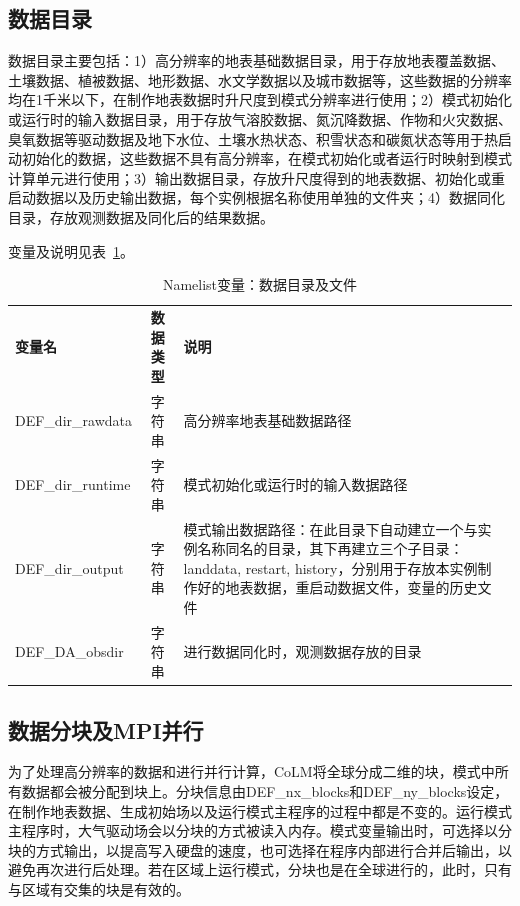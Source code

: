 \documentclass[a4paper,12pt,twoside]{article}
\begin{document}
\subsection{数据目录}

数据目录主要包括：1）高分辨率的地表基础数据目录，用于存放地表覆盖数据、土壤数据、植被数据、地形数据、水文学数据以及城市数据等，这些数据的分辨率均在1千米以下，在制作地表数据时升尺度到模式分辨率进行使用；2）模式初始化或运行时的输入数据目录，用于存放气溶胶数据、氮沉降数据、作物和火灾数据、臭氧数据等驱动数据及地下水位、土壤水热状态、积雪状态和碳氮状态等用于热启动初始化的数据，这些数据不具有高分辨率，在模式初始化或者运行时映射到模式计算单元进行使用；3）输出数据目录，存放升尺度得到的地表数据、初始化或重启动数据以及历史输出数据，每个实例根据名称使用单独的文件夹；4）数据同化目录，存放观测数据及同化后的结果数据。

变量及说明见表~\ref{table_nl_dir_file}。

\begin{table}[!htbp] \small
\caption{Namelist变量：数据目录及文件} \label{table_nl_dir_file}
\centering \renewcommand{\arraystretch}{1.2}
\begin{tabular}{lcp{}}
\toprule
\textbf{变量名} & \textbf{数据类型} & \textbf{说明} \\
DEF\_dir\_rawdata & 字符串 & 高分辨率地表基础数据路径 \\
DEF\_dir\_runtime & 字符串 & 模式初始化或运行时的输入数据路径 \\
DEF\_dir\_output & 字符串 & 模式输出数据路径：在此目录下自动建立一个与实例名称同名的目录，其下再建立三个子目录：landdata, restart, history，分别用于存放本实例制作好的地表数据，重启动数据文件，变量的历史文件 \\
DEF\_DA\_obsdir & 字符串 & 进行数据同化时，观测数据存放的目录 \\
\bottomrule
\end{tabular} 
\end{table}

\subsection{数据分块及MPI并行}

为了处理高分辨率的数据和进行并行计算，CoLM将全球分成二维的块，模式中所有数据都会被分配到块上。分块信息由DEF\_nx\_blocks和DEF\_ny\_blocks设定，在制作地表数据、生成初始场以及运行模式主程序的过程中都是不变的。运行模式主程序时，大气驱动场会以分块的方式被读入内存。模式变量输出时，可选择以分块的方式输出，以提高写入硬盘的速度，也可选择在程序内部进行合并后输出，以避免再次进行后处理。若在区域上运行模式，分块也是在全球进行的，此时，只有与区域有交集的块是有效的。
\end{document}
